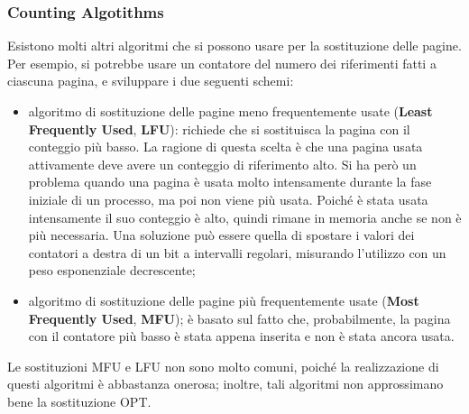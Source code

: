 \documentclass{article}
\begin{document}
			\subsubsection{Counting Algotithms}
				Esistono molti altri algoritmi che si possono usare per la sostituzione delle pagine. Per esempio, si potrebbe usare un contatore del numero dei riferimenti fatti a ciascuna pagina, e sviluppare i due seguenti schemi:
				\begin{itemize}
					\item algoritmo di sostituzione delle pagine meno frequentemente usate (\textbf{Least Frequently Used}, \textbf{LFU}): richiede che si sostituisca la pagina con il conteggio più basso. La ragione di questa scelta è che una pagina usata attivamente deve avere un conteggio di riferimento alto. Si ha però un problema quando una pagina è usata molto intensamente durante la fase iniziale di un processo, ma poi non viene più usata. Poiché è stata usata intensamente il suo conteggio è alto, quindi rimane in memoria anche se non è più necessaria. Una soluzione può essere quella di spostare i valori dei contatori a destra di un bit a intervalli regolari, misurando l’utilizzo con un peso esponenziale decrescente;
					\item algoritmo di sostituzione delle pagine più frequentemente usate (\textbf{Most Frequently Used}, \textbf{MFU}); è basato sul fatto che, probabilmente, la pagina con il contatore più basso è stata appena inserita e non è stata ancora usata.
				\end{itemize}
				Le sostituzioni MFU e LFU non sono molto comuni, poiché la realizzazione di questi algoritmi è abbastanza onerosa; inoltre, tali algoritmi non approssimano bene la sostituzione OPT.
\end{document}
